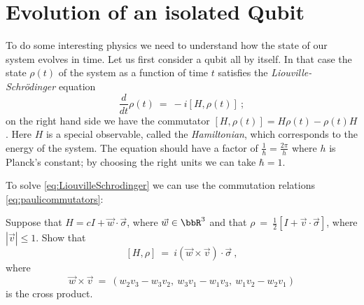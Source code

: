 \documentclass[12pt]{amsart}
\numberwithin{equation}{section}
\numberwithin{figure}{section}
\theoremstyle{theorem}
\begin{document}
\section{Evolution of an isolated Qubit}
To do some interesting physics we need to understand how the state of our 
system evolves in time.   Let us first consider a qubit all by itself.  In that 
case the state $\rho(t)$ of the system as a function of time $t$ satisfies the 
\emph{Liouville-Schr\"odinger} equation
\begin{equation}\label{eq:LiouvilleSchrodinger}
	\frac{d}{dt} \rho(t) \ = \ - i [H,\rho(t)] \ ;
\end{equation}
on the right hand side we have the commutator $[H,\rho(t)] = H\rho(t) -\rho(t) 
H$. Here $H$ is a special observable, called the \emph{Hamiltonian}, which 
corresponds to the energy of the system. The equation should have a factor of 
$\frac{1}{\hbar} = \frac{2\pi}{h}$ where $h$ is Planck's constant; by choosing 
the right units we can take $\hbar =1$.  
	
To solve \eqref{eq:LiouvilleSchrodinger} we can use the commutation relations 
\eqref{eq:paulicommutators}:  

\begin{exer}Suppose that $H = c I + \vec{w}\cdot \vec{\sigma}$, where 
$\vec{w}\in \bbR^3$ 
	and that $\rho \ = \ \frac{1}{2}[I + \vec{v}\cdot \vec{\sigma}] $, where 
	$|\vec{v}| \le 1$. Show that
	$$[H,\rho] \ = \ i (\vec{w}\times \vec{v}) \cdot \vec{\sigma} \ , $$
	where 
	$$ \vec{w} \times \vec{v} \ = \ (w_2v_3 - w_3v_2, \ w_3v_1-w_1v_3, \ 
	w_1v_2-w_2v_1) $$
	is the cross product.
	\end{exer}
\end{document}
